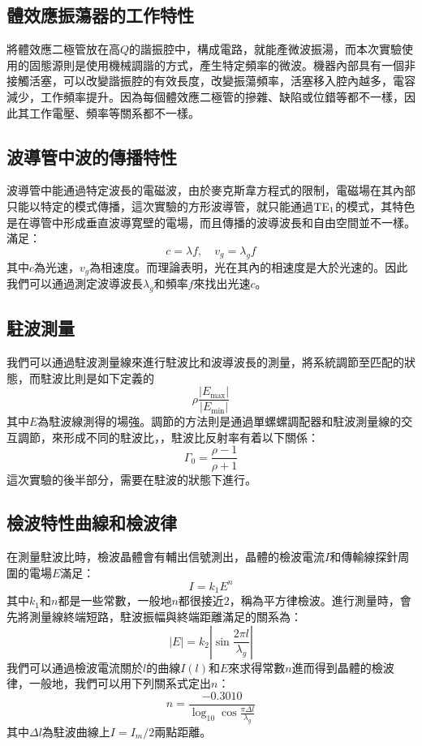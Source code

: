 \documentclass[font=fandol]{mpltx}
\begin{document}
\subsection{體效應振蕩器的工作特性}
將體效應二極管放在高$Q$的諧振腔中，構成電路，就能產微波振湯，而本次實驗使用的固態源則是使用機械調諧的方式，產生特定頻率的微波。機器內部具有一個非接觸活塞，可以改變諧振腔的有效長度，改變振蕩頻率，活塞移入腔內越多，電容減少，工作頻率提升。因為每個體效應二極管的摻雜、缺陷或位錯等都不一樣，因此其工作電壓、頻率等關系都不一樣。
\subsection{波導管中波的傳播特性}
波導管中能通過特定波長的電磁波，由於麥克斯韋方程式的限制，電磁場在其內部只能以特定的模式傳播，這次實驗的方形波導管，就只能通過$\rm{TE_1}$的模式，其特色是在導管中形成垂直波導寛壁的電場，而且傳播的波導波長和自由空間並不一樣。滿足：
$$c=\lambda f, \quad v_g=\lambda_gf$$
其中$c$為光速，$v_g$為相速度。而理論表明，光在其內的相速度是大於光速的。因此我們可以通過測定波導波長$\lambda_g$和頻率$f$來找出光速$c$。
\subsection{駐波測量}
我們可以通過駐波測量線來進行駐波比和波導波長的測量，將系統調節至匹配的狀態，而駐波比則是如下定義的
$$\rho\frac{|E_{\max}|}{|E_{\min}|}$$
其中$E$為駐波線測得的場強。調節的方法則是通過單螺螺調配器和駐波測量線的交互調節，來形成不同的駐波比，，駐波比反射率有着以下關係：
$$\Gamma_0=\frac{\rho -1}{\rho+1}$$
這次實驗的後半部分，需要在駐波的狀態下進行。
\subsection{檢波特性曲線和檢波律}
在測量駐波比時，檢波晶體會有輔出信號測出，晶體的檢波電流$I$和傳輸線探針周圍的電場$E$滿足：
$$I=k_1E^n$$
其中$k_1$和$n$都是一些常數，一般地$n$都很接近$2$，稱為平方律檢波。進行測量時，會先將測量線終端短路，駐波振幅與終端距離滿足的關系為：
$$|E|=k_2|\sin{\frac{2\pi l}{\lambda_g}}|$$
我們可以通過檢波電流關於$l$的曲線$I(l)$和$E$來求得常數$n$進而得到晶體的檢波律，一般地，我們可以用下列關系式定出$n$：
$$n=\frac{-0.3010}{\log_{10}{\cos\frac{{\pi\Delta l}}{\lambda_g}}}$$
其中$\Delta l$為駐波曲線上$I=I_m/2$兩點距離。
\end{document}
